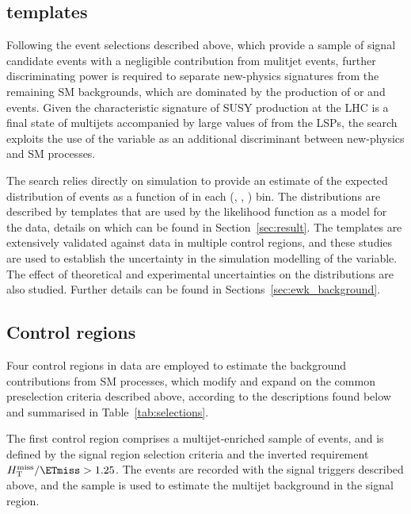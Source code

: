 \subsection{\texorpdfstring{\HTmiss}{HTmiss} templates}
\label{sec:mht_templates} 

Following the event selections described above, which provide a sample
of signal candidate events with a negligible contribution from
mulitjet events, further discriminating power is required to separate
new-physics signatures from the remaining SM backgrounds, which are
dominated by the production of \ttbar or \wlj and \znunuj
events. Given the characteristic signature of SUSY production at the
LHC is a final state of multijets accompanied by large values of
\ptvecmiss from the LSPs, the search exploits the use of the \HTmiss
variable as an additional discriminant between new-physics and SM
processes.

The search relies directly on simulation to provide an estimate of the
expected distribution of events as a function of \HTmiss in each
(\njet, \nb, \scalht) bin. The distributions are described by
templates that are used by the likelihood function as a model for the
data, details on which can be found in
Section~\ref{sec:result}. The templates are extensively
validated against data in multiple control regions, and these studies
are used to establish the uncertainty in the simulation modelling of
the \HTmiss variable. The effect of theoretical and experimental
uncertainties on the \HTmiss distributions are also studied. Further
details can be found in Sections~\ref{sec:ewk_background}.


\subsection{Control regions}
\label{sec:control_regions}

Four control regions in data are employed to estimate the background
contributions from SM processes, which modify and expand on the
common preselection criteria described above, according to the
descriptions found below and summarised in Table~\ref{tab:selections}.

The first control region comprises a multijet-enriched sample of
events, and is defined by the signal region selection criteria and the
inverted requirement $\HTmiss / \ETmiss > 1.25$. The events are
recorded with the signal triggers described above, and the sample is
used to estimate the multijet background in the signal region.
 
